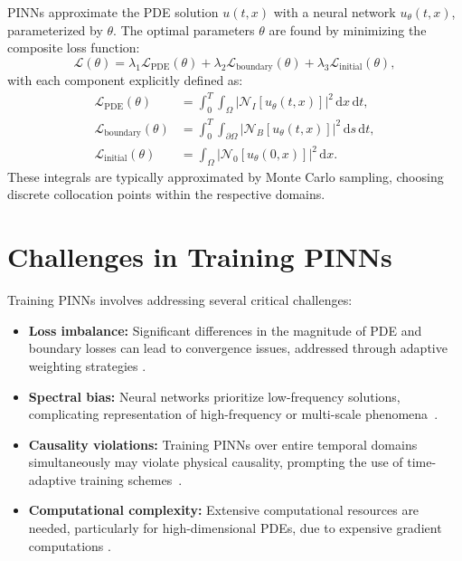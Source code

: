 \documentclass[12pt]{report} %
\theoremstyle{plain}           %
\theoremstyle{definition}      %
\theoremstyle{remark}          %
\begin{document}
PINNs approximate the PDE solution \(u(t,x)\) with a neural network \(u_\theta(t,x)\), 
parameterized by \(\theta\). The optimal parameters \(\theta\) are found by minimizing 
the composite loss function:
\begin{equation}
	\mathcal{L}(\theta) = \lambda_1 \mathcal{L}_{\text{PDE}}(\theta) + \lambda_2 \mathcal{L}_{\text{boundary}}(\theta) + \lambda_3 \mathcal{L}_{\text{initial}}(\theta),
	\label{eq:total_loss}
\end{equation}
with each component explicitly defined as:
\begin{equation}
	\begin{aligned}
		\mathcal{L}_{\text{PDE}}(\theta) &= \int_{0}^{T}\int_{\Omega}\left|\mathcal{N}_I[u_\theta(t,x)]\right|^2\,\mathrm{d}x\,\mathrm{d}t, \\
		\mathcal{L}_{\text{boundary}}(\theta) &= \int_{0}^{T}\int_{\partial\Omega}\left|\mathcal{N}_B[u_\theta(t,x)]\right|^2\,\mathrm{d}s\,\mathrm{d}t, \\
		\mathcal{L}_{\text{initial}}(\theta) &= \int_{\Omega}\left|\mathcal{N}_0[u_\theta(0,x)]\right|^2\,\mathrm{d}x.
	\end{aligned}
	\label{eq:loss_terms}
\end{equation}
These integrals are typically approximated by Monte Carlo sampling, 
choosing discrete collocation points within the respective domains.

\section{Challenges in Training PINNs}
Training PINNs involves addressing several critical challenges:
\begin{itemize}
    \item \textbf{Loss imbalance:} Significant differences in the magnitude of PDE and boundary 
	losses can lead to convergence issues, addressed through adaptive weighting strategies \cite{wang2020understandingmitigatinggradientpathologies}.
    
    \item \textbf{Spectral bias:} Neural networks prioritize low-frequency solutions, complicating 
	representation of high-frequency or multi-scale phenomena~\cite{wang2023expertsguidetrainingphysicsinformed}.
    
    \item \textbf{Causality violations:} Training PINNs over entire temporal domains simultaneously 
	may violate physical causality, prompting the use of time-adaptive training schemes~\cite{wang2022respectingcausalityneedtraining}.
    
    \item \textbf{Computational complexity:} Extensive computational resources are needed, particularly 
	for high-dimensional PDEs, due to expensive gradient computations \cite{karniadakis2021physics}.
\end{itemize}
\end{document}
